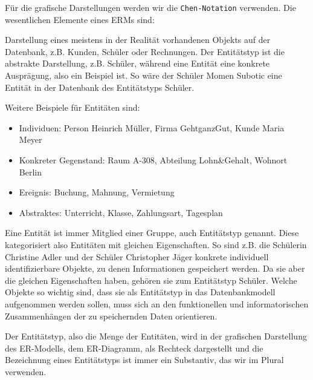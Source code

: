 Für die grafische Darstellungen werden wir die \texttt{Chen-Notation} verwenden. Die wesentlichen Elemente eines ERMs sind:
\begin{tcolorbox}[title=Entitätstypen und Entitäten]
	Darstellung eines meistens in der Realität vorhandenen Objekts auf der Datenbank, z.B. Kunden, Schüler oder Rechnungen. Der Entitätstyp ist die abstrakte Darstellung, z.B. Schüler, während eine Entität eine konkrete Ausprägung, also ein Beispiel ist. So wäre der Schüler Momen Subotic eine Entität in der Datenbank des Entitätstyps Schüler.

	Weitere Beispiele für Entitäten sind:
	\begin{itemize}
		\item Individuen: Person Heinrich Müller, Firma GehtganzGut, Kunde Maria Meyer
		\item Konkreter Gegenstand: Raum A-308, Abteilung Lohn\&Gehalt, Wohnort Berlin
		\item Ereignis: Buchung, Mahnung, Vermietung
		\item Abstraktes: Unterricht, Klasse, Zahlungsart, Tagesplan
	\end{itemize}
	Eine Entität ist immer Mitglied einer Gruppe, auch Entitätstyp genannt. Diese kategorisiert also Entitäten mit gleichen Eigenschaften. So sind z.B. die Schülerin Christine Adler und der Schüler Christopher Jäger konkrete individuell identifizierbare Objekte, zu denen Informationen gespeichert werden. Da sie aber die gleichen Eigenschaften haben, gehören sie zum Entitätstyp Schüler. Welche Objekte so wichtig sind, dass sie als Entitätstyp in das Datenbankmodell aufgenommen werden sollen, muss sich an den funktionellen und informatorischen Zusammenhängen der zu speichernden Daten orientieren.

	Der Entitätstyp, also die Menge der Entitäten, wird in der grafischen Darstellung des ER-Modells, dem ER-Diagramm, als Rechteck dargestellt und die Bezeichnung eines Entitätstyps ist immer ein Substantiv, das wir im Plural verwenden.
\end{tcolorbox}
